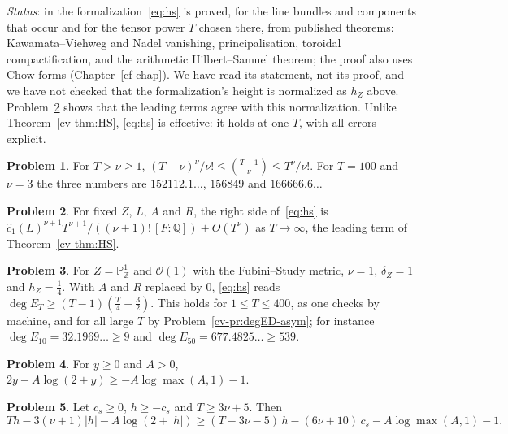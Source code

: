\documentclass[reqno]{amsart}
\newcounter{chap}
\theoremstyle{definition}
\newtheorem{problem}{Problem}[section]
\theoremstyle{plain}
\theoremstyle{remark}
\newcommand{\Z}{\mathbb Z}
\newcommand{\Q}{\mathbb Q}
\newcommand{\Pb}{\mathbb P}
\newcommand{\Oc}{\mathcal O}
\newcommand{\cc}{\hat{c}_1}
\begin{document}
\emph{Status}: in the formalization~\eqref{eq:hs} is proved, for the line bundles and components that occur and for the tensor power \(T\) chosen there, from published theorems: Kawamata--Viehweg and Nadel vanishing, principalisation, toroidal compactification, and the arithmetic Hilbert--Samuel theorem; the proof also uses Chow forms (Chapter~\ref{cf-chap}).  We have read its statement, not its proof, and we have not checked that the formalization's height is normalized as \(h_Z\) above.  Problem~\ref{pr:hs-leading} shows that the leading terms agree with this normalization.  Unlike Theorem~\ref{cv-thm:HS}, \eqref{eq:hs} is effective: it holds at one \(T\), with all errors explicit.

\begin{problem}\label{pr:binom}
For \(T > \nu \ge 1\), \((T-\nu)^\nu/\nu! \le \binom{T-1}{\nu} \le T^\nu/\nu!\).  For \(T = 100\) and \(\nu = 3\) the three numbers are \(152112.1\ldots\), \(156849\) and \(166666.6\ldots\)
\end{problem}

\begin{problem}\label{pr:hs-leading}
For fixed \(Z\), \(L\), \(A\) and \(R\), the right side of~\eqref{eq:hs} is \(\cc(L)^{\nu+1}T^{\nu+1}/((\nu+1)!\,[F:\Q]) + O(T^\nu)\) as \(T \to \infty\), the leading term of Theorem~\ref{cv-thm:HS}.
\end{problem}

\begin{problem}\label{pr:hs-P1}
For \(Z = \Pb^1_\Z\) and \(\Oc(1)\) with the Fubini--Study metric, \(\nu = 1\), \(\delta_Z = 1\) and \(h_Z = \frac14\).  With \(A\) and \(R\) replaced by \(0\), \eqref{eq:hs} reads \(\deg E_T \ge (T-1)(\frac T4 - \frac32)\).  This holds for \(1 \le T \le 400\), as one checks by machine, and for all large \(T\) by Problem~\ref{cv-pr:degED-asym}; for instance \(\deg E_{10} = 32.1969\ldots \ge 9\) and \(\deg E_{50} = 677.4825\ldots \ge 539\).
\end{problem}

\begin{problem}\label{pr:log-term}
For \(y \ge 0\) and \(A > 0\), \(2y - A\log(2 + y) \ge -A\log\max(A,1) - 1\).
\end{problem}

\begin{problem}\label{pr:abs-trick}
Let \(c_s \ge 0\), \(h \ge -c_s\) and \(T \ge 3\nu + 5\).  Then
\[
  Th - 3(\nu+1)\lvert h\rvert - A\log(2 + \lvert h\rvert) \ge (T - 3\nu - 5)\,h - (6\nu + 10)\,c_s - A\log\max(A,1) - 1 .
\]
\end{problem}
\end{document}
